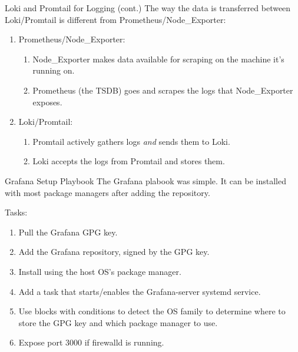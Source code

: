 \documentclass[14pt,compress,usenames,dvipsnames,aspectratio=169]{beamer}
\begin{document}
\begin{frame}{Loki and Promtail for Logging (cont.)}
    The way the data is transferred between Loki/Promtail is different from Prometheus/Node\_Exporter:
    \begin{enumerate}
        \item{Prometheus/Node\_Exporter:} 
        \begin{enumerate}
            \item{Node\_Exporter makes data available for scraping on the machine it's running on.} 
            \item{Prometheus (the TSDB) goes and scrapes the logs that Node\_Exporter exposes.} 
        \end{enumerate}
        \item{Loki/Promtail:} 
        \begin{enumerate}
            \item{Promtail actively gathers logs \textit{and} sends them to Loki.} 
            \item{Loki accepts the logs from Promtail and stores them.} 
        \end{enumerate}
    \end{enumerate}
\end{frame}



\begin{frame}{Grafana Setup Playbook}
The Grafana plabook was simple. It can be installed with most package managers after
    adding the repository.  

    Tasks:
    \begin{enumerate}
        \item{Pull the Grafana GPG key.} 
        \item{Add the Grafana repository, signed by the GPG key.}
        \item{Install using the host OS's package manager.}
        \item{Add a task that starts/enables the Grafana-server systemd service.}
        \item{Use blocks with conditions to detect the OS family to determine where
            to store the GPG key and which package manager to use.}
        \item{Expose port 3000 if firewalld is running.}
    \end{enumerate}
\end{frame}
\end{document}
